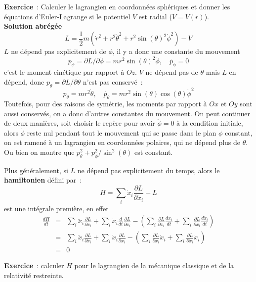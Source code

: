 \documentclass[a4paper,11pt]{article}
\begin{document}
\begin{giacjshere}
{\bf Exercice}~: Calculer le lagrangien en coordonn\'ees sph\'eriques
et donner les \'equations d'Euler-Lagrange si le potentiel
$V$ est radial ($V=V(r)$).\\
{\bf Solution abr\'eg\'ee}
$$ L=\frac{1}{2}m(\dot{r}^2+r^2\dot{\theta}^2+r^2\sin(\theta)^2
\dot{\phi}^2)-V$$
$L$ ne d\'epend pas explicitement de $\phi$, il y a donc une constante
du mouvement 
$$p_\phi=\partial L/\partial{\dot{\phi}} = m r^2 \sin(\theta)^2 
\dot{\phi}, \quad \dot{p_\phi}=0$$ 
c'est le moment cin\'etique par rapport \`a $Oz$.
$V$ ne d\'epend pas de $\theta$ mais $L$ en d\'epend, donc
$p_\theta=\partial L/\partial{\dot{\theta}}$ 
n'est pas conserv\'e~:
$$ p_\theta=mr^2\dot{\theta}, 
\quad \dot{p_\theta}=mr^2\sin(\theta)\cos(\theta)\dot{\phi}^2$$
Toutefois, pour des raisons de sym\'etrie, les moments par rapport \`a
$Ox$ et $Oy$ sont aussi conserv\'es, on a donc d'autres constantes
du mouvement. On peut continuer de deux mani\`eres, soit choisir
le rep\`ere pour avoir $\dot{\phi}=0$ \`a la condition initiale, alors
$\dot{\phi}$ reste nul pendant tout le mouvement qui se passe dans
le plan $\phi$ constant, on est ramen\'e \`a un lagrangien en
coordonn\'ees polaires, qui ne d\'epend plus de $\theta$.
Ou bien on montre que $p_\theta^2+p_\phi^2/\sin^2(\theta)$
est constant.

Plus g\'en\'eralement, si $L$ ne d\'epend pas explicitement du temps,
alors le {\bf hamiltonien} d\'efini par~:
$$ H = \sum_i \dot{x}_i \frac{\partial L}{\partial \dot{x}_i} - L$$
est une int\'egrale premi\`ere, en effet
\begin{eqnarray*}
\frac{dH}{dt} &= &\sum_i \ddot{x}_i \frac{\partial L}{\partial
  \dot{x}_i} + \sum_i \dot{x}_i \frac{d}{dt}\frac{\partial
  L}{\partial \dot{x}_i}
- \left(\sum_i \frac{\partial L}{\partial x_i} \frac{dx_i}{dt}
+\sum_i \frac{\partial L}{\partial \dot{x}_i} \frac{d\dot{x}_i}{dt}
\right)\\
& =& 
\sum_i \ddot{x}_i \frac{\partial L}{\partial
  \dot{x}_i} + \sum_i \dot{x}_i \frac{\partial  L}{\partial x_i}
- \left(\sum_i \frac{\partial L}{\partial x_i} \dot{x}_i
+\sum_i \frac{\partial L}{\partial \dot{x}_i} \ddot{x}_i
\right) \\
&=&0
\end{eqnarray*}

{\bf Exercice}~: calculer $H$ pour le lagrangien de la m\'ecanique
classique et de la relativit\'e restreinte.


\end{giacjshere}
\end{document}
